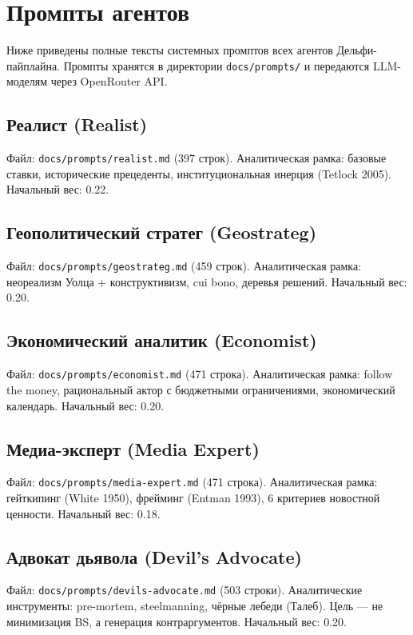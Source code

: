 \section{Промпты агентов}
\label{app:prompts}

Ниже приведены полные тексты системных промптов всех агентов
Дельфи-пайплайна. Промпты хранятся в директории
\texttt{docs/prompts/} и передаются LLM-моделям через OpenRouter API.

\subsection{Реалист (Realist)}
\label{app:prompt_realist}
Файл: \texttt{docs/prompts/realist.md} (397 строк).
Аналитическая рамка: базовые ставки, исторические прецеденты,
институциональная инерция (Tetlock 2005). Начальный вес: 0.22.

\subsection{Геополитический стратег (Geostrateg)}
\label{app:prompt_geostrateg}
Файл: \texttt{docs/prompts/geostrateg.md} (459 строк).
Аналитическая рамка: неореализм Уолца + конструктивизм,
cui bono, деревья решений. Начальный вес: 0.20.

\subsection{Экономический аналитик (Economist)}
\label{app:prompt_economist}
Файл: \texttt{docs/prompts/economist.md} (471 строка).
Аналитическая рамка: follow the money, рациональный актор с бюджетными ограничениями,
экономический календарь. Начальный вес: 0.20.

\subsection{Медиа-эксперт (Media Expert)}
\label{app:prompt_media_expert}
Файл: \texttt{docs/prompts/media-expert.md} (471 строка).
Аналитическая рамка: гейткипинг (White 1950), фрейминг (Entman 1993),
6 критериев новостной ценности. Начальный вес: 0.18.

\subsection{Адвокат дьявола (Devil's Advocate)}
\label{app:prompt_devils_advocate}
Файл: \texttt{docs/prompts/devils-advocate.md} (503 строки).
Аналитические инструменты: pre-mortem, steelmanning, чёрные лебеди (Талеб).
Цель --- не минимизация BS, а генерация контраргументов. Начальный вес: 0.20.

